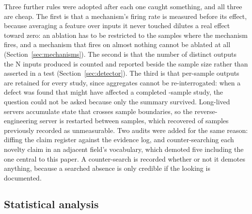 Three further rules were adopted after each one caught something, and all three are cheap. The first is that a mechanism's firing rate is measured before its effect, because averaging a
feature over inputs it never touched dilutes a real effect toward zero: an ablation has to be
restricted to the samples where the mechanism fires, and a mechanism that fires on almost nothing
cannot be ablated at all (Section~\ref{sec:mechanisms}). The second is that the number of distinct
outputs the N inputs produced is counted and reported beside the sample size rather than asserted in
a test (Section~\ref{sec:detector}). The third is that per-sample outputs are retained for every study, since aggregates cannot
be re-interrogated:
when a defect was found that might have affected a completed -sample study, the
question could not be asked because only the summary survived. Long-lived servers accumulate state
that crosses sample boundaries, so the reverse-engineering server is restarted between samples,
which recovered  of  samples previously recorded as
unmeasurable. Two audits were added for the same reason: diffing the claim register against
the evidence log, and counter-searching each novelty claim in an adjacent field's vocabulary, which
demoted five including the one central to this paper. A counter-search is recorded whether or not it
demotes anything, because a searched absence is only credible if the looking is documented.

\subsection{Statistical analysis}\label{statistical-analysis}

